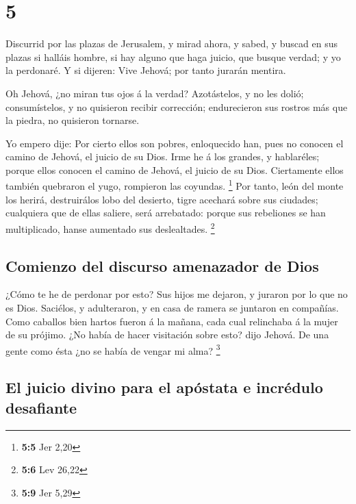\hypertarget{section-4}{%
\section{5}\label{section-4}}

 Discurrid por las plazas de Jerusalem, y mirad ahora, y
sabed, y buscad en sus plazas si halláis hombre, si hay alguno que haga
juicio, que busque verdad; y yo la perdonaré.  Y si dijeren:
Vive Jehová; por tanto jurarán mentira.

 Oh Jehová, ¿no miran tus ojos á la verdad? Azotástelos, y
no les dolió; consumístelos, y no quisieron recibir corrección;
endurecieron sus rostros más que la piedra, no quisieron tornarse.

 Yo empero dije: Por cierto ellos son pobres, enloquecido
han, pues no conocen el camino de Jehová, el juicio de su Dios.
 Irme he á los grandes, y hablaréles; porque ellos conocen
el camino de Jehová, el juicio de su Dios. Ciertamente ellos también
quebraron el yugo, rompieron las coyundas. \footnote{\textbf{5:5} Jer
  2,20}  Por tanto, león del monte los herirá, destruirálos
lobo del desierto, tigre acechará sobre sus ciudades; cualquiera que de
ellas saliere, será arrebatado: porque sus rebeliones se han
multiplicado, hanse aumentado sus deslealtades. \footnote{\textbf{5:6}
  Lev 26,22}

\hypertarget{comienzo-del-discurso-amenazador-de-dios}{%
\subsection{Comienzo del discurso amenazador de
Dios}\label{comienzo-del-discurso-amenazador-de-dios}}

 ¿Cómo te he de perdonar por esto? Sus hijos me dejaron, y
juraron por lo que no es Dios. Saciélos, y adulteraron, y en casa de
ramera se juntaron en compañías.  Como caballos bien hartos
fueron á la mañana, cada cual relinchaba á la mujer de su prójimo.
 ¿No había de hacer visitación sobre esto? dijo Jehová. De
una gente como ésta ¿no se había de vengar mi alma? \footnote{\textbf{5:9}
  Jer 5,29}

\hypertarget{el-juicio-divino-para-el-apuxf3stata-e-incruxe9dulo-desafiante}{%
\subsection{El juicio divino para el apóstata e incrédulo
desafiante}\label{el-juicio-divino-para-el-apuxf3stata-e-incruxe9dulo-desafiante}}

